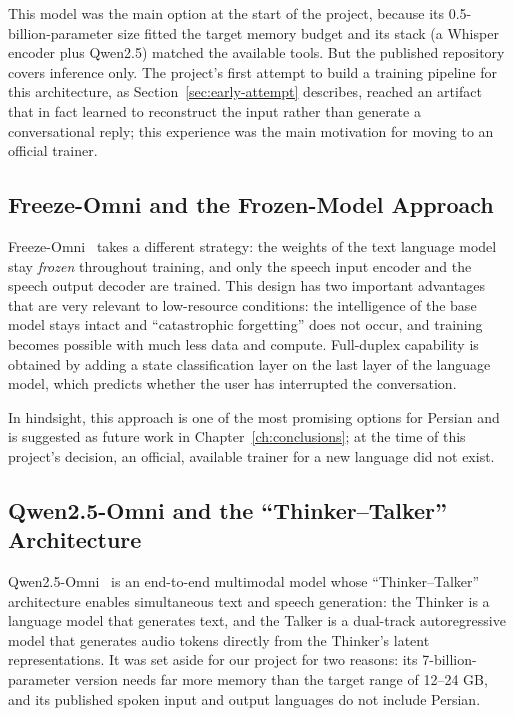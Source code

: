 This model was the main option at the start of the project, because its
0.5-billion-parameter size fitted the target memory budget and its stack (a Whisper
encoder plus Qwen2.5) matched the available tools. But the published repository
covers inference only. The project's first attempt to build a training pipeline for
this architecture, as Section~\ref{sec:early-attempt} describes, reached an
artifact that in fact learned to reconstruct the input rather than generate a
conversational reply; this experience was the main motivation for moving to an
official trainer.

\subsection{Freeze-Omni and the Frozen-Model Approach}

Freeze-Omni~\cite{wang2025freezeomni} takes a different strategy: the weights of
the text language model stay \emph{frozen} throughout training, and only the speech
input encoder and the speech output decoder are trained. This design has two
important advantages that are very relevant to low-resource conditions: the
intelligence of the base model stays intact and ``catastrophic forgetting'' does not
occur, and training becomes possible with much less data and compute. Full-duplex
capability is obtained by adding a state classification layer on the last layer of
the language model, which predicts whether the user has interrupted the
conversation.

In hindsight, this approach is one of the most promising options for Persian and is
suggested as future work in Chapter~\ref{ch:conclusions}; at the time of this
project's decision, an official, available trainer for a new language did not
exist.

\subsection{Qwen2.5-Omni and the ``Thinker--Talker'' Architecture}

Qwen2.5-Omni~\cite{xu2025qwen25omni} is an end-to-end multimodal model whose
``Thinker--Talker'' architecture enables simultaneous text and speech generation:
the Thinker is a language model that generates text, and the Talker is a dual-track
autoregressive model that generates audio tokens directly from the Thinker's latent
representations. It was set aside for our project for two reasons: its
7-billion-parameter version needs far more memory than the target range of
12--24 GB, and its published spoken input and output languages do not include
Persian.

